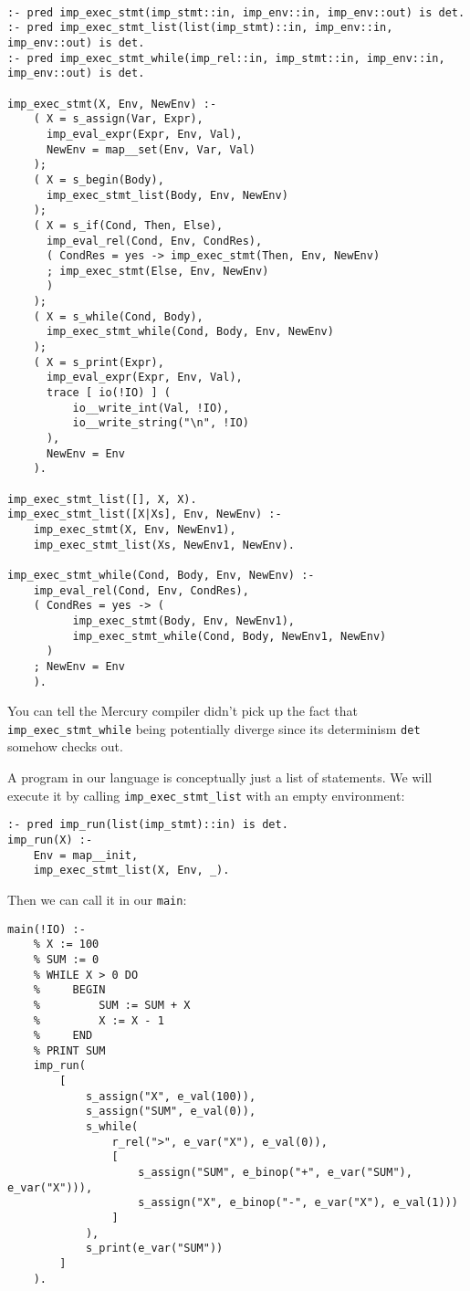\begin{lstlisting}[language=Mercury]

:- pred imp_exec_stmt(imp_stmt::in, imp_env::in, imp_env::out) is det.
:- pred imp_exec_stmt_list(list(imp_stmt)::in, imp_env::in, imp_env::out) is det.
:- pred imp_exec_stmt_while(imp_rel::in, imp_stmt::in, imp_env::in, imp_env::out) is det.

imp_exec_stmt(X, Env, NewEnv) :-
	( X = s_assign(Var, Expr),
	  imp_eval_expr(Expr, Env, Val),
	  NewEnv = map__set(Env, Var, Val)
	);
	( X = s_begin(Body),
	  imp_exec_stmt_list(Body, Env, NewEnv)
	);
	( X = s_if(Cond, Then, Else),
	  imp_eval_rel(Cond, Env, CondRes),
	  ( CondRes = yes -> imp_exec_stmt(Then, Env, NewEnv)
	  ; imp_exec_stmt(Else, Env, NewEnv)
	  )
	);
	( X = s_while(Cond, Body),
	  imp_exec_stmt_while(Cond, Body, Env, NewEnv)
	);
	( X = s_print(Expr),
	  imp_eval_expr(Expr, Env, Val),
	  trace [ io(!IO) ] (
		  io__write_int(Val, !IO),
		  io__write_string("\n", !IO)
	  ),
	  NewEnv = Env
	).

imp_exec_stmt_list([], X, X).
imp_exec_stmt_list([X|Xs], Env, NewEnv) :-
	imp_exec_stmt(X, Env, NewEnv1),
	imp_exec_stmt_list(Xs, NewEnv1, NewEnv).

imp_exec_stmt_while(Cond, Body, Env, NewEnv) :-
	imp_eval_rel(Cond, Env, CondRes),
	( CondRes = yes -> (
		  imp_exec_stmt(Body, Env, NewEnv1),
		  imp_exec_stmt_while(Cond, Body, NewEnv1, NewEnv)
	  )
	; NewEnv = Env
	).
\end{lstlisting}

You can tell the Mercury compiler didn't pick up the fact that \texttt{imp_exec_stmt_while} being potentially diverge since its determinism \texttt{det} somehow checks out.

A program in our language is conceptually just a list of statements. We will execute it by calling \texttt{imp_exec_stmt_list} with an empty environment:

\begin{lstlisting}[language=Mercury]
:- pred imp_run(list(imp_stmt)::in) is det.
imp_run(X) :-
	Env = map__init,
	imp_exec_stmt_list(X, Env, _).
\end{lstlisting}

Then we can call it in our \texttt{main}:

\begin{lstlisting}[language=Mercury]
main(!IO) :-
    % X := 100
    % SUM := 0
    % WHILE X > 0 DO
    %     BEGIN
    %         SUM := SUM + X
    %         X := X - 1
    %     END
    % PRINT SUM
	imp_run(
		[
			s_assign("X", e_val(100)),
			s_assign("SUM", e_val(0)),
			s_while(
				r_rel(">", e_var("X"), e_val(0)),
				[
					s_assign("SUM", e_binop("+", e_var("SUM"), e_var("X"))),
					s_assign("X", e_binop("-", e_var("X"), e_val(1)))
				]
			),
			s_print(e_var("SUM"))
		]
	).
\end{lstlisting}


